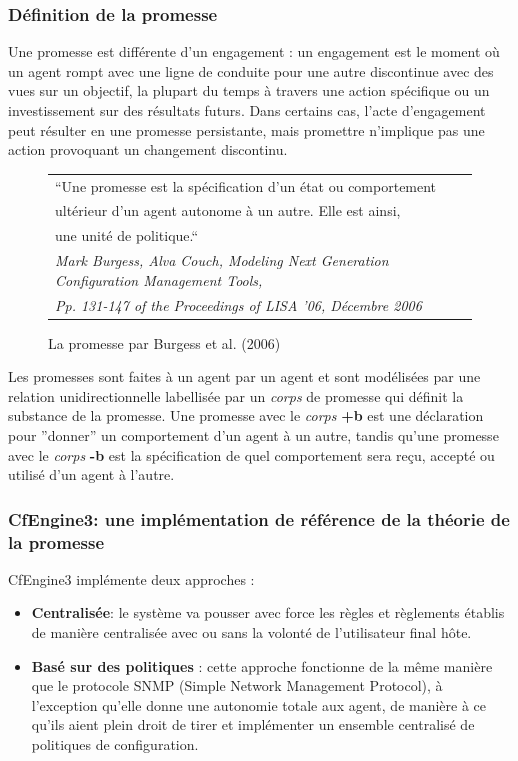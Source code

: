 \subsubsection{Définition de la promesse}

Une promesse est différente d'un engagement : un engagement est le moment où un
agent rompt avec une ligne de conduite pour une autre discontinue avec des vues
sur un objectif, la plupart du temps à travers une action spécifique ou un
investissement sur des résultats futurs. Dans certains cas, l'acte
d'engagement peut résulter en une promesse persistante, mais promettre
n'implique pas une action provoquant un changement discontinu.

\begin{figure}[H]
    \centering
    \begin{tabular}{l}
        ``Une promesse est la spécification d'un état ou comportement \\
        ultérieur d'un agent autonome à un autre. Elle est ainsi, \\
        une unité de politique.`` \cite{burgess_modeling_2006} \\
        \em \footnotesize Mark Burgess, Alva Couch, Modeling Next Generation
        Configuration Management Tools, \\
        \em \footnotesize Pp. 131-147 of the Proceedings of LISA '06,
        Décembre 2006
    \end{tabular}
    \caption{La promesse par Burgess et al. (2006)}
    \label{fig:quote}
\end{figure}

Les promesses sont faites à un agent par un agent et sont modélisées par une
relation unidirectionnelle labellisée par un \emph{corps} de promesse qui
définit la substance de la promesse. Une promesse avec le \emph{corps}
\textbf{+b} est une déclaration pour ''donner'' un comportement d'un agent à un
autre, tandis qu'une promesse avec le \emph{corps} \textbf{-b} est la
spécification de quel comportement sera reçu, accepté ou utilisé d'un agent à
l'autre.

\subsubsection{CfEngine3: une implémentation de référence de la théorie de la
promesse}

CfEngine3 implémente deux approches :

\begin{itemize}
    \item \textbf{Centralisée}: 
        le système va pousser avec force les règles et règlements établis de
        manière centralisée avec ou sans la volonté de l'utilisateur final hôte.
    \item \textbf{Basé sur des politiques} :
        cette approche fonctionne de la même manière que le protocole SNMP
        (Simple Network Management Protocol), à l'exception qu'elle donne une
        autonomie totale aux agent, de manière à ce qu'ils aient plein droit de
        tirer et implémenter un ensemble centralisé de politiques de
        configuration.
\end{itemize}

